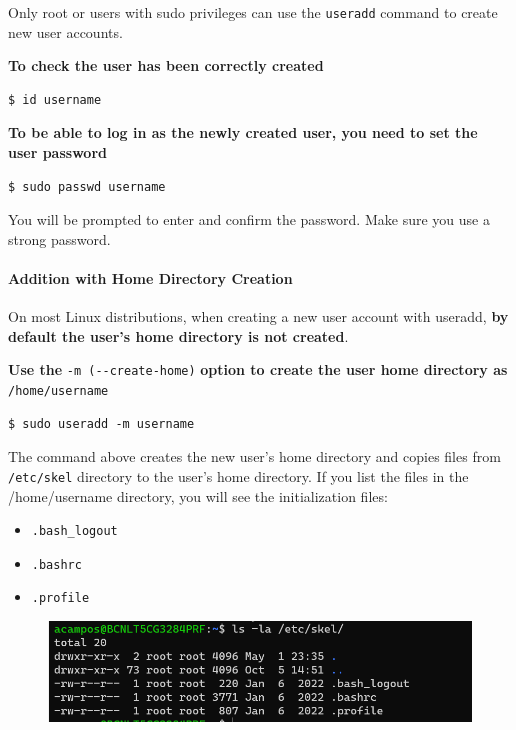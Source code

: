 \documentclass{article}
\newenvironment{blocktemplateIII}[1]{%
    \tcolorbox[beamer,%
    noparskip,breakable,
    ,colframe=Red,%
    colbacklower=LimeGreen!75!LightGreen,%
    title=#1]}%
    {\endtcolorbox}
\newenvironment{codetemplate}[1][]{%
  \mybasecolorbox[#1]
  \itshape
}{%
  \endmybasecolorbox
}
\begin{document}
\begin{blocktemplateIII}{WARNING}
Only root or users with sudo privileges can use the \verb|useradd| command to create new user accounts.
\end{blocktemplateIII}

\textbf{To check the user has been correctly created}
\begin{codetemplate}{}
\begin{verbatim}
$ id username
\end{verbatim}
\end{codetemplate}

\textbf{To be able to log in as the newly created user, you need to set the user password}
\begin{codetemplate}{}
\begin{verbatim}
$ sudo passwd username
\end{verbatim}
\end{codetemplate}
You will be prompted to enter and confirm the password. Make sure you use a strong password.

\paragraph{Addition with Home Directory Creation}
On most Linux distributions, when creating a new user account with useradd, \textbf{by default the user’s home directory is not created}.

\textbf{Use the} \verb|-m (--create-home)| \textbf{option to create the user home directory as} \verb|/home/username|
\begin{codetemplate}{}
\begin{verbatim}
$ sudo useradd -m username
\end{verbatim}
\end{codetemplate}
The command above creates the new user’s home directory and copies files from \verb|/etc/skel| directory to the user’s home directory. If you list the files in the /home/username directory, you will see the initialization files:
\begin{itemize}
    \item \verb|.bash_logout|
    \item \verb|.bashrc|
    \item \verb|.profile|
\end{itemize}

\begin{figure}[H]
    \includegraphics[scale=0.7]{pictures/etcskel.png}
    \centering
\end{figure}
\end{document}
